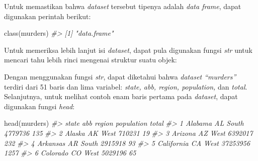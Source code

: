 \documentclass[
]{article}
\newenvironment{Shaded}{\begin{snugshade}}{\end{snugshade}}
\newcommand{\CommentTok}[1]{\textcolor[rgb]{0.56,0.35,0.01}{\textit{#1}}}
\newcommand{\FunctionTok}[1]{\textcolor[rgb]{0.00,0.00,0.00}{#1}}
\newcommand{\NormalTok}[1]{#1}
\begin{document}
Untuk memastikan bahwa \emph{dataset} tersebut tipenya adalah \emph{data
frame}, dapat digunakan perintah berikut:

\begin{Shaded}
\begin{Highlighting}[]
\FunctionTok{class}\NormalTok{(murders) }
\CommentTok{\#\textgreater{} [1] "data.frame"  }
\end{Highlighting}
\end{Shaded}

Untuk memeriksa lebih lanjut isi \emph{dataset}, dapat pula digunakan
fungsi \emph{str} untuk mencari tahu lebih rinci mengenai struktur suatu
objek:

\begin{Shaded}
\end{Shaded}

Dengan menggunakan fungsi \emph{str}, dapat diketahui bahwa
\emph{dataset ``murders''} terdiri dari 51 baris dan lima variabel:
\emph{state, abb, region, population,} dan \emph{total}. Selanjutnya,
untuk melihat contoh enam baris pertama pada \emph{dataset}, dapat
digunakan fungsi \emph{head}:

\begin{Shaded}
\begin{Highlighting}[]
\FunctionTok{head}\NormalTok{(murders) }
\CommentTok{\#\textgreater{} state abb region population total }
\CommentTok{\#\textgreater{} 1 Alabama AL South 4779736 135 }
\CommentTok{\#\textgreater{} 2 Alaska AK West 710231 19 }
\CommentTok{\#\textgreater{} 3 Arizona AZ West 6392017 232 }
\CommentTok{\#\textgreater{} 4 Arkansas AR South 2915918 93 }
\CommentTok{\#\textgreater{} 5 California CA West 37253956 1257 }
\CommentTok{\#\textgreater{} 6 Colorado CO West 5029196 65 }
\end{Highlighting}
\end{Shaded}
\end{document}
